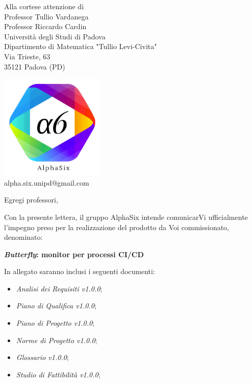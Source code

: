 \documentclass[12pt]{letter} %
\begin{document}

		
	\begin{letter}{%
		Alla cortese attenzione di
		\\Professor Tullio Vardanega
		\\Professor Riccardo Cardin
		\vspace{0.7em}
		\\Università degli Studi di Padova
		\\Dipartimento di Matematica "Tullio Levi-Civita"
		\\Via Trieste, 63
		\\35121 Padova (PD)
	} %

	\begin{center}
		\includegraphics[width=5cm]{../template/icons/a6.png}
		\\ alpha.six.unipd@gmail.com
	\end{center}

	\opening{%
		Egregi professori,
	}

	\begin{addmargin}[2em]{2em}
		\hspace{1cm} %
		Con la presente lettera, il gruppo AlphaSix intende comunicarVi ufficialmente l'impegno preso
		per la realizzazione del prodotto da Voi commissionato, denominato:
		\begin{center}
			\textbf{\textit{Butterfly}: monitor per processi CI/CD}
		\end{center}
		In allegato saranno inclusi i seguenti documenti:
		\begin{itemize}
			\item \emph{Analisi dei Requisiti v1.0.0};
			\item \emph{Piano di Qualifica v1.0.0};
			\item \emph{Piano di Progetto v1.0.0};
			\item \emph{Norme di Progetto v1.0.0};
			\item \emph{Glossario v1.0.0};
			\item \emph{Studio di Fattibilità v1.0.0};
      	\end{itemize}


\end{addmargin}
\end{letter}
\end{document}

